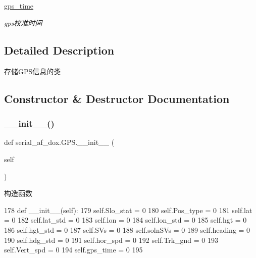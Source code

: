 \begin{DoxyCompactItemize}
\begin{DoxyCompactList}\small\item\em \subsection*{}\end{DoxyCompactList}\item 
\hyperlink{classserial__af__dox_1_1_g_p_s_a0622c18d58da0a3c24bd9ae1a1ab0265}{gps\+\_\+time}
\begin{DoxyCompactList}\small\item\em gps校准时间 \end{DoxyCompactList}\end{DoxyCompactItemize}


\subsection{Detailed Description}
存储\+G\+P\+S信息的类 



\subsection{Constructor \& Destructor Documentation}
\mbox{\label{classserial__af__dox_1_1_g_p_s_abbccf898ad305fb8d6c881e5697edd99}} 
\subsubsection{\texorpdfstring{\+\_\+\+\_\+init\+\_\+\+\_\+()}{\_\_init\_\_()}}
{\footnotesize\ttfamily def serial\+\_\+af\+\_\+dox.\+G\+P\+S.\+\_\+\+\_\+init\+\_\+\+\_\+ (\begin{DoxyParamCaption}\item[{}]{self }\end{DoxyParamCaption})}



构造函数 


\begin{DoxyCode}
178     \textcolor{keyword}{def }\_\_init\_\_(self):
179         self.Slo\_stat = 0
180         self.Pos\_type = 0
181         self.lat = 0
182         self.lat\_std = 0
183         self.lon = 0
184         self.lon\_std = 0
185         self.hgt = 0
186         self.hgt\_std = 0
187         self.SVs = 0
188         self.solnSVs = 0
189         self.heading = 0
190         self.hdg\_std = 0
191         self.hor\_spd = 0
192         self.Trk\_gnd = 0
193         self.Vert\_spd = 0
194         self.gps\_time = 0
195 
\end{DoxyCode}


